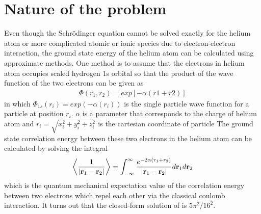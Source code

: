 \section{Nature of the problem}
\label{sec:NatureOfTheProblem}
Even though the Schr\"{o}dinger equation cannot be solved exactly for the helium atom or more complicated atomic or ionic species due to  electron-electron interaction, the ground state energy of the helium atom can be calculated using approximate methods. 
One method is to assume that the electrons in helium atom occupies scaled hydrogen 1s orbital so that the product of the wave function of the two electrons can be given as
\begin{align}
	\Phi (r_1, r_2 ) = exp[-\alpha ( r1+ r2)]
	\label{eq:NatureOfTheProblem1}
\end{align}
in which $\Phi_{1s}(r_i) = exp(-\alpha ( r_i))$ is the single particle wave function for a particle at position $r_i$.
$\alpha$ is a parameter that corresponds to the charge of helium atom and 
$r_i = \sqrt{x_i^2+y_i^2+z_i^2}$ 
is the cartesian coordinate of particle
The ground state correlation energy between these two electrons in the helium atom can be calculated by solving the integral
\begin{align}
	\left< \frac{1}{| \mbox{\textbf{r}}_1 - \mbox{\textbf{r}}_2 |} \right> 
   = \int _{-\infty } ^{\infty } \frac{e^{-2\alpha (r_1+r_2)}}{| \mbox{\textbf{r}}_1 - \mbox{\textbf{r}}_2 |} d \mbox{\textbf{r}}_1 d\mbox{\textbf{r}}_2
   \label{eq:NatureOfTheProblem2}
\end{align}
which is the quantum mechanical expectation value of the correlation energy between two electrons which repel each other via the classical coulomb interaction.
It turns out that the closed-form solution of  is $5\pi ^2 / 16^2$.





